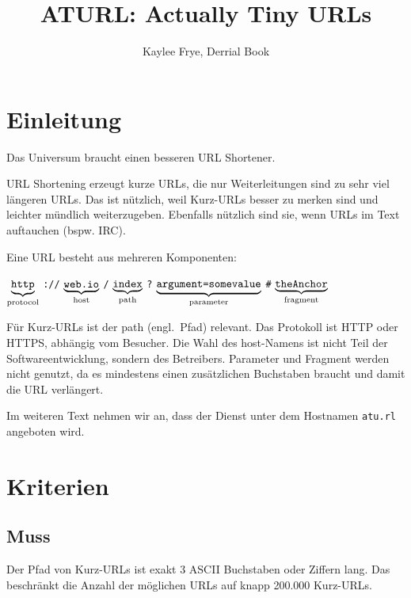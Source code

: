 \documentclass[parskip=full,11pt,twoside]{scrartcl}
\title{ATURL: Actually Tiny URLs}
\author{Kaylee Frye, Derrial Book}
\newcommand\urlpart[2]{$\underbrace{\text{\texttt{#1}}}_{\text{#2}}$}
\begin{document}
\maketitle

\section{Einleitung}

Das Universum braucht einen besseren URL Shortener.

URL Shortening erzeugt kurze URLs,
die nur Weiterleitungen sind zu sehr viel längeren URLs.
Das ist nützlich, weil Kurz-URLs besser zu merken sind
und leichter mündlich weiterzugeben.
Ebenfalls nützlich sind sie,
wenn URLs im Text auftauchen (bspw. IRC).

Eine URL besteht aus mehreren Komponenten:

\begin{center}
\urlpart{http}{protocol}%
\texttt{://}%
\urlpart{web.io}{host}%
\texttt{/}%
\urlpart{index}{path}%
\texttt{?}%
\urlpart{argument=somevalue}{parameter}%
\texttt{\#}%
\urlpart{theAnchor}{fragment}
\end{center}

Für Kurz-URLs ist der path (engl.\ Pfad) relevant.
Das Protokoll ist HTTP oder HTTPS, abhängig vom Besucher.
Die Wahl des host-Namens ist nicht Teil der Softwareentwicklung,
sondern des Betreibers.
Parameter und Fragment werden nicht genutzt,
da es mindestens einen zusätzlichen Buchstaben braucht
und damit die URL verlängert.

Im weiteren Text nehmen wir an,
dass der Dienst unter dem Hostnamen \texttt{atu.rl} angeboten wird.

\pagebreak
\section{Kriterien}

\subsection{Muss}


Der Pfad von Kurz-URLs ist exakt 3 ASCII Buchstaben oder Ziffern lang.
Das beschränkt die Anzahl der möglichen URLs auf knapp 200.000 Kurz-URLs.

\end{document}

